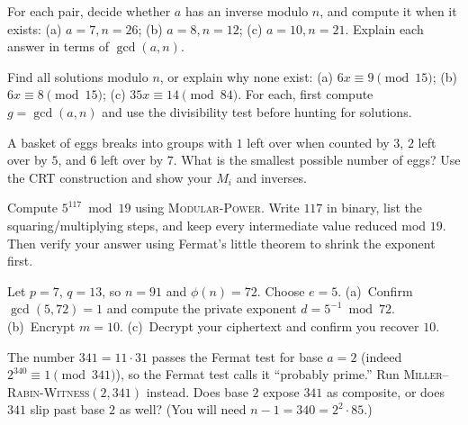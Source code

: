 \begin{exercise}
\label{ch30:ex-inv}
For each pair, decide whether $a$ has an inverse modulo $n$, and compute it when
it exists: (a) $a=7, n=26$; (b) $a=8, n=12$; (c) $a=10, n=21$. Explain each
answer in terms of $\gcd(a,n)$.
\end{exercise}

\begin{exercise}
\label{ch30:ex-cong}
Find all solutions modulo $n$, or explain why none exist:
(a) $6x \equiv 9 \pmod{15}$; \;
(b) $6x \equiv 8 \pmod{15}$; \;
(c) $35x \equiv 14 \pmod{84}$.
For each, first compute $g = \gcd(a,n)$ and use the divisibility test before
hunting for solutions.
\end{exercise}

\begin{exercise}
\label{ch30:ex-crt2}
A basket of eggs breaks into groups with $1$ left over when counted by $3$, $2$
left over by $5$, and $6$ left over by $7$. What is the smallest possible number
of eggs? Use the \textsc{CRT} construction and show your $M_i$ and inverses.
\end{exercise}

\begin{exercise}
\label{ch30:ex-fastexp}
Compute $5^{117} \bmod 19$ using \textsc{Modular-Power}. Write $117$ in binary,
list the squaring/multiplying steps, and keep every intermediate value reduced
mod $19$. Then verify your answer using Fermat's little theorem to shrink the
exponent first.
\end{exercise}

\begin{exercise}
\label{ch30:ex-rsa2}
Let $p = 7$, $q = 13$, so $n = 91$ and $\phi(n) = 72$. Choose $e = 5$.
(a)~Confirm $\gcd(5,72)=1$ and compute the private exponent $d = 5^{-1} \bmod 72$.
(b)~Encrypt $m = 10$. (c)~Decrypt your ciphertext and confirm you recover $10$.
\end{exercise}

\begin{exercise}
\label{ch30:ex-mr2}
The number $341 = 11 \cdot 31$ passes the Fermat test for base $a = 2$ (indeed
$2^{340} \equiv 1 \pmod{341}$), so the Fermat test calls it ``probably prime.''
Run \textsc{Miller--Rabin-Witness}$(2, 341)$ instead. Does base $2$ expose $341$
as composite, or does $341$ slip past base $2$ as well? (You will need
$n-1 = 340 = 2^2 \cdot 85$.)
\end{exercise}

